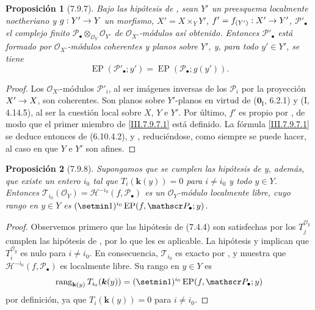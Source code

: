 \documentclass[10pt,oneside,openany]{book}
\theoremstyle{egaenv}\newtheorem*{env}{---}
\theoremstyle{egastatement}
\newtheorem*{proposition}{Proposición}
\theoremstyle{egadescription}
\renewcommand{\to}{\mathchoice{\longrightarrow}{\rightarrow}{\rightarrow}{\rightarrow}}
\begin{document}
\begin{proposition}[7.9.7]
\label{III.7.9.7}
\label{III.7.9.7.fr}
Bajo las hipótesis de \textup{}, sean $Y'$ un preesquema
localmente noetheriano y $g:Y'\to Y$ un morfismo, $X'=X\times_Y Y'$, $f'=f_{(Y')}:X'\to Y'$,
$\mathscr P'_\bullet$ el complejo finito
$\mathscr P_\bullet\otimes_{\mathscr O_Y}\mathscr O_{Y'}$
de $\mathscr O_{X'}$-módulos así obtenido.
Entonces $\mathscr P'_\bullet$ está formado por
$\mathscr O_{X'}$-módulos coherentes y planos sobre $Y'$, y, para
todo $y'\in Y'$, se tiene
\[
  \operatorname{EP}(\mathscr P'_\bullet;y')
  =\operatorname{EP}(\mathscr P_\bullet;g(y')).
  \tag{7.9.7.1}\label{III.7.9.7.1.fr}
\]
\end{proposition}

\begin{proof}
Los $\mathscr O_{X'}$-módulos $\mathscr P'_i$, al ser imágenes
inversas de los $\mathscr P_i$ por la proyección $X'\to X$, son
coherentes. Son planos sobre $Y'$-planos en
virtud de ($\mathbf{0}_{\mathrm I}$, 6.2.1) y (I, 4.14.5), al ser la cuestión local sobre
$X$, $Y$ e $Y'$. Por último, $f'$ es propio por
, de modo que el primer miembro de
\eqref{III.7.9.7.1} está definido. La fórmula
\eqref{III.7.9.7.1} se deduce entonces de
\textup{(6.10.4.2)},  y
, reduciéndose, como siempre se puede hacer, al
caso en que $Y$ e $Y'$ son afines.
\end{proof}

\begin{proposition}[7.9.8]
\label{III.7.9.8}
\label{III.7.9.8.fr}
Supongamos que se cumplen las hipótesis de \textup{} y,
además, que existe un entero $i_0$ tal que $T_i(\boldsymbol{k}(y))=0$ para $i\ne i_0$ y todo $y\in Y$.
Entonces $\mathscr T_{i_0}(\mathscr O_Y)=\mathscr H^{-i_0}(f,\mathscr P_\bullet)$
es un $\mathscr O_Y$-módulo localmente libre, cuyo rango en
$y\in Y$ es
$(\setmin 1)^{i_0}\operatorname{EP}(f,\mathscr P_\bullet;y)$.
\end{proposition}

\begin{proof}
Observemos primero que las hipótesis de (7.4.4) son satisfechas por los $T_j^{\mathscr O_y}$ cumplen las hipótesis de
, por lo que  les es aplicable.
La hipótesis y  implican que
$T_i^{\mathscr O_y}$ es nulo para $i\ne i_0$.
En consecuencia, $\mathscr T_{i_0}$ es exacto por
, y  muestra que
$\mathscr H^{-i_0}(f,\mathscr P_\bullet)$ es localmente libre.
Su rango en $y\in Y$ es
\[
  \operatorname{rang}_{\mathbf{k}(y)}
  T_{i_0}(\boldsymbol{k}(y))
  =(\setmin 1)^{i_0}\operatorname{EP}(f,\mathscr P_\bullet;y)
\]
por definición, ya que $T_i(\boldsymbol{k}(y))=0$ para
$i\ne i_0$.
\end{proof}
\end{document}
